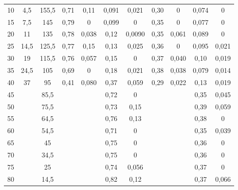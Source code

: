 \begin{landscape}
\begin{table}[!ht]
\begin{tabular}{ccccccccccc}
                10             & 4,5           & 155,5    & 0,71   & 0,11    & 0,091   & 0,021   & 0,30 & 0         & 0,074   & 0      \\
                15             & 7,5           & 145      & 0,79   & 0       & 0,099   & 0       & 0,35 & 0         & 0,077   & 0      \\
                20             & 11            & 135      & 0,78   & 0,038   & 0,12    & 0,0090  & 0,35 & 0,061     & 0,089   & 0      \\
                25             & 14,5          & 125,5    & 0,77   & 0,15    & 0,13    & 0,025   & 0,36 & 0         & 0,095   & 0,021  \\
                30             & 19            & 115,5    & 0,76   & 0,057   & 0,15    & 0       & 0,37 & 0,040     & 0,10    & 0,019  \\
                35             & 24,5          & 105      & 0,69   & 0       & 0,18    & 0,021   & 0,38 & 0,038     & 0,079   & 0,014  \\
                40             & 37            & 95       & 0,41   & 0,080   & 0,37    & 0,059   & 0,29 & 0,022     & 0,13    & 0,019  \\
                45             &               & 85,5     &        &         & 0,72    & 0       &      &           & 0,35    & 0,045  \\
                50             &               & 75,5     &        &         & 0,73    & 0,15    &      &           & 0,39    & 0,059  \\
                55             &               & 64,5     &        &         & 0,76    & 0,13    &      &           & 0,38    & 0      \\
                60             &               & 54,5     &        &         & 0,71    & 0       &      &           & 0,35    & 0,039  \\
                65             &               & 45       &        &         & 0,75    & 0       &      &           & 0,36    & 0      \\
                70             &               & 34,5     &        &         & 0,75    & 0       &      &           & 0,36    & 0      \\
                75             &               & 25       &        &         & 0,74    & 0,056   &      &           & 0,37    & 0      \\
                80             &               & 14,5     &        &         & 0,82    & 0,12    &      &           & 0,37    & 0,066  \\     
                \hline
                \end{tabular}
\end{table}



\end{landscape}
